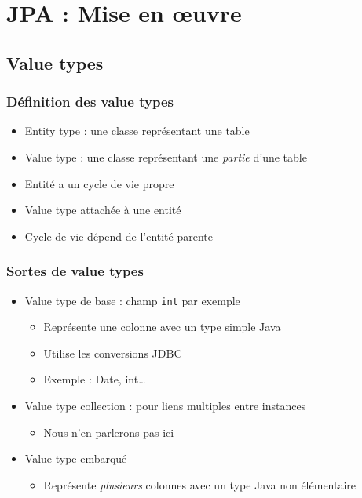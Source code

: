 \documentclass[french, english]{beamer}
\begin{document}
\section{JPA : Mise en œuvre}
\subsection{Value types}
\begin{frame}
	\frametitle{Définition des value types}
	\begin{itemize}
		\item Entity type : une classe représentant une table
		\item Value type : une classe représentant une \emph{partie} d’une table
		\item Entité a un cycle de vie propre
		\item Value type attachée à une entité
		\item Cycle de vie dépend de l’entité parente
	\end{itemize}
\end{frame}

\begin{frame}
	\frametitle{Sortes de value types}
	\begin{itemize}
		\item Value type de base : champ \texttt{int} par exemple
		\begin{itemize}
			\item Représente une colonne avec un type simple Java
			\item Utilise les conversions JDBC
			\item Exemple : Date, int…
		\end{itemize}
		\item Value type collection : pour liens multiples entre instances
		\begin{itemize}
			\item Nous n’en parlerons pas ici
		\end{itemize}
		\item Value type embarqué
		\begin{itemize}
			\item Représente \emph{plusieurs} colonnes avec un type Java non élémentaire
		\end{itemize}
	\end{itemize}
\end{frame}
\end{document}
